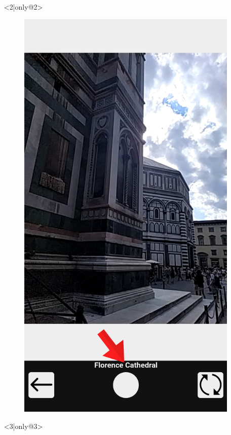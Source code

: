 \documentclass{beamer}
\begin{document}
\begin{frame}
\begin{columns}
\begin{itemize}
\begin{figure}[!h]
 		\end{figure}
 	\item[] <2|only@2> 
		\begin{figure}[!h]
 			\centering
 			\includegraphics[scale=0.1]{"Immagini/open_camera1.jpg"}
 		\end{figure}
 	\item[] <3|only@3> 

\end{itemize}
\end{columns}
\end{frame}
\end{document}
